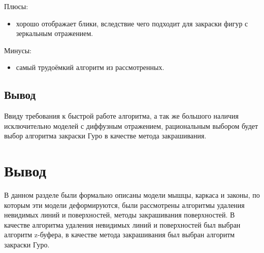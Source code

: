 Плюсы:
\begin{itemize}
    \item хорошо отображает блики, вследствие чего подходит для закраски фигур с зеркальным отражением.
\end{itemize}

Минусы:
\begin{itemize}
    \item самый трудоёмкий алгоритм из рассмотренных.
\end{itemize}

\subsection*{Вывод}

Ввиду требования к быстрой работе алгоритма, а так же большого наличия исключительно моделей с диффузным отражением, рациональным выбором будет выбор алгоритма закраски Гуро в качестве метода закрашивания.


\section*{Вывод}

В данном разделе были формально описаны модели мышцы, каркаса и законы, по которым эти модели деформируются, были рассмотрены алгоритмы удаления невидимых линий и поверхностей, методы закрашивания поверхностей. В качестве алгоритма удаления невидимых линий и поверхностей был выбран алгоритм z-буфера, в качестве метода закрашивания был выбран алгоритм закраски Гуро.
